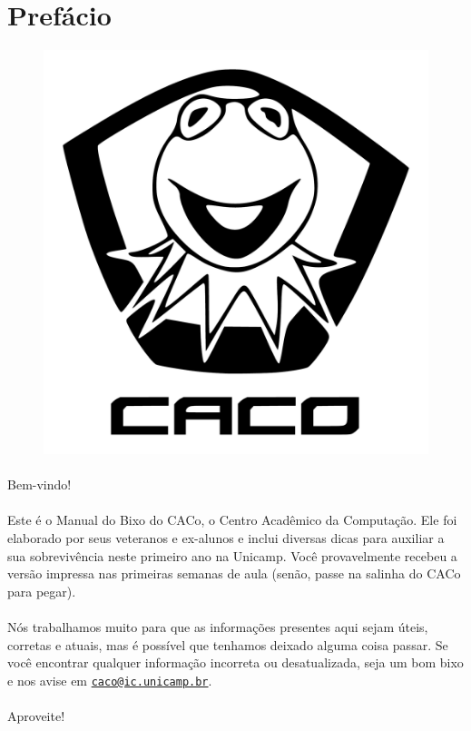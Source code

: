\documentclass[a4paper,10pt]{book}
\newcommand{\email}[1]{\href{mailto:#1}{\nolinkurl{#1}}}
\begin{document}
\clearpage

\section*{Prefácio}
\begin{figure}[H]
    \centering
    \includegraphics[width=.65\textwidth]{img/caco/logo.pdf}
\end{figure}
\paragraph{}
Bem-vindo!

\paragraph{}
Este é o Manual do Bixo do CACo, o Centro Acadêmico da Computação. Ele foi 
elaborado por seus veteranos e ex-alunos e inclui diversas dicas para auxiliar 
a sua sobrevivência neste primeiro ano na Unicamp. Você provavelmente recebeu a
versão impressa nas primeiras semanas de aula (senão, passe na salinha do CACo
para pegar).

\paragraph{}
Nós trabalhamos muito para que as informações presentes aqui sejam úteis,
corretas e atuais, mas é possível que tenhamos deixado alguma coisa passar. Se
você encontrar qualquer informação incorreta ou desatualizada, seja um bom bixo
e nos avise em \email{caco@ic.unicamp.br}.

\paragraph{}
Aproveite!
\end{document}
